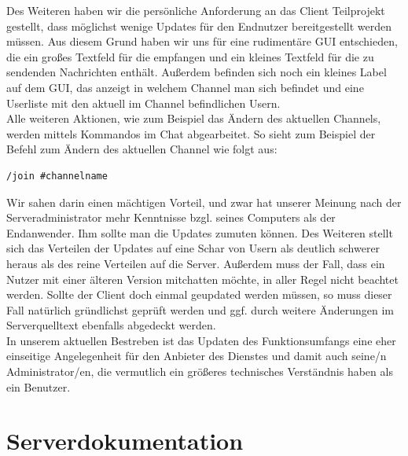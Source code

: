 \documentclass[a4paper,12pt]{scrartcl}
\begin{document}
Des Weiteren haben wir die persönliche Anforderung an das Client Teilprojekt gestellt, dass möglichst wenige Updates für den Endnutzer bereitgestellt werden müssen. Aus diesem Grund haben wir uns für eine rudimentäre GUI entschieden, die ein großes Textfeld für die empfangen und ein kleines Textfeld für die zu sendenden Nachrichten enthält. Außerdem befinden sich noch ein kleines Label auf dem GUI, das anzeigt in welchem Channel man sich befindet und eine Userliste mit den aktuell im Channel befindlichen Usern.\\

Alle weiteren Aktionen, wie zum Beispiel das Ändern des aktuellen Channels, werden mittels Kommandos im Chat abgearbeitet. So sieht zum Beispiel der Befehl zum Ändern des aktuellen Channel wie folgt aus:
\begin{lstlisting}[frame=single,caption=Beispiel eines Befehls]
/join #channelname
\end{lstlisting}
Wir sahen darin einen mächtigen Vorteil, und zwar hat unserer Meinung nach der Serveradministrator mehr Kenntnisse bzgl. seines Computers als der Endanwender. Ihm sollte man die Updates zumuten können. Des Weiteren stellt sich das Verteilen der Updates auf eine Schar von Usern als deutlich schwerer heraus als des reine Verteilen auf die Server. Außerdem muss der Fall, dass ein Nutzer mit einer älteren Version mitchatten möchte, in aller Regel nicht beachtet werden. Sollte der Client doch einmal geupdated werden müssen, so muss dieser Fall natürlich gründlichst geprüft werden und ggf. durch weitere Änderungen im Serverquelltext ebenfalls abgedeckt werden.\\

In unserem aktuellen Bestreben ist das Updaten des Funktionsumfangs eine eher einseitige Angelegenheit für den Anbieter des Dienstes und damit auch seine/n Administrator/en, die vermutlich ein größeres technisches Verständnis haben als ein Benutzer.
\section{Serverdokumentation}
\end{document}
